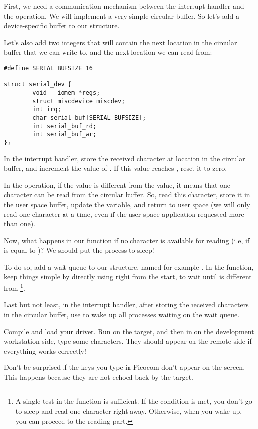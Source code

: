 First, we need a communication mechanism between the interrupt handler
and the  operation. We will implement a very simple
circular buffer. So let's add a device-specific buffer to our
 structure.

Let's also add two integers that will contain the next location
in the circular buffer that we can write to, and the next location
we can read from:

\begin{verbatim}
#define SERIAL_BUFSIZE 16

struct serial_dev {
        void __iomem *regs;
        struct miscdevice miscdev;
        int irq;
        char serial_buf[SERIAL_BUFSIZE];
        int serial_buf_rd;
        int serial_buf_wr;
};
\end{verbatim}

In the interrupt handler, store the received character at location
 in the circular buffer, and increment the value
of . If this value reaches ,
reset it to zero.

In the  operation, if the  value is
different from the  value, it means that one
character can be read from the circular buffer. So, read this
character, store it in the user space buffer, update the
 variable, and return to user space (we will only
read one character at a time, even if the user space application
requested more than one).

Now, what happens in our  function if no character is
available for reading (i.e, if  is equal to
)? We should put the process to sleep!

To do so, add a wait queue to our  structure,
named for example . In the  function,
keep things simple by directly using 
right from the start, to wait until 
is different from \footnote{A single test in the
 function is sufficient. If the
condition is met, you don't go to sleep and read one character right away.
Otherwise, when you wake up, you can proceed to the reading part.}.

Last but not least, in the interrupt handler,
after storing the received characters in the circular buffer, use
 to wake up all processes waiting on the wait queue.

Compile and load your driver. Run 
on the target, and then in  on the development
workstation side, type some characters. They should appear on the
remote side if everything works correctly!

Don't be surprised if the keys you type in Picocom don't appear on the
screen. This happens because they are not echoed back by the target.
